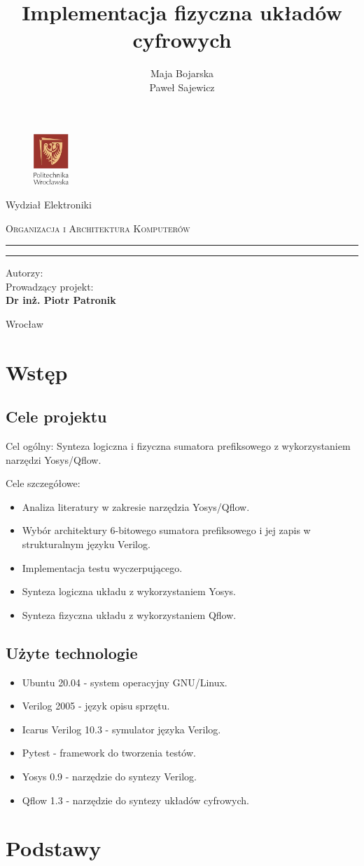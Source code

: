 \documentclass[12pt,oneside,reqno]{article}
\author{Maja Bojarska \\
        Paweł Sajewicz \\}
\title{Implementacja fizyczna układów cyfrowych}
\makeatletter
\newcommand{\linia}{\rule{\linewidth}{0.4mm}}
\renewcommand{\maketitle}{\begin{titlepage}
    \begin{figure}[H]
    \centering
    \includegraphics[width=50px]{images/pwrlogo.jpg}
    \label{fig:logo}
    \end{figure}
    \begin{center}   
        Wydział Elektroniki
    \end{center}
    \vspace{1cm}
    \begin{center}
        \Large \textsc{Organizacja i Architektura Komputerów}
    \end{center}
    \vspace{1cm}
    \noindent\linia
    \begin{center}
      \Huge \textsc{\@title}
         \end{center}
     \linia
    \vspace{2cm}
    \begin{flushright}
    \small Autorzy:\\
    \normalsize \textbf{\@author}
        \vspace{1cm}
        \vspace{3cm}
        {\small Prowadzący projekt:}\\
        \textbf{Dr inż. Piotr Patronik}
    \end{flushright}
    \begin{center}
    Wrocław \@date
    \end{center}
  \end{titlepage}
}
\makeatother
\begin{document}
\maketitle
\clearpage
\tableofcontents
\clearpage

\setlength{\parskip}{0.5em}

\section{Wstęp}
\subsection{Cele projektu}
Cel ogólny: Synteza logiczna i fizyczna sumatora prefiksowego z wykorzystaniem narzędzi Yosys/Qflow.

Cele szczegółowe:
\begin{itemize}
    \item Analiza literatury w zakresie narzędzia Yosys/Qflow.
    \item Wybór architektury 6-bitowego sumatora prefiksowego i jej zapis w strukturalnym języku Verilog.
    \item Implementacja testu wyczerpującego.
    \item Synteza logiczna układu z wykorzystaniem Yosys.
    \item Synteza fizyczna układu z wykorzystaniem Qflow.
\end{itemize}

\subsection{Użyte technologie}
\begin{itemize}
    \item Ubuntu 20.04 \cite{ubuntu} - system operacyjny GNU/Linux.
    \item Verilog 2005 \cite{ieee-verilog} - język opisu sprzętu.
    \item Icarus Verilog 10.3 \cite{iverilog} - symulator języka Verilog.
    \item Pytest \cite{pytest} - framework do tworzenia testów.
    \item Yosys 0.9 \cite{yosys} - narzędzie do syntezy Verilog.
    \item Qflow 1.3 \cite{qflow} - narzędzie do syntezy układów cyfrowych.
\end{itemize}

\clearpage
\section{Podstawy}
\end{document}
